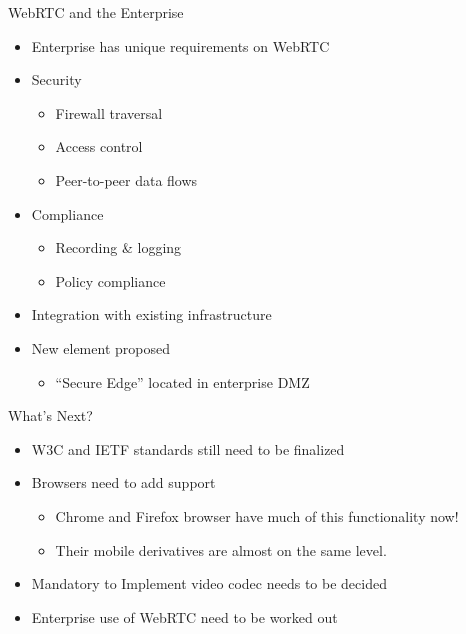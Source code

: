 \begin{frame}{WebRTC and the Enterprise}
\begin{itemize}
\item Enterprise has unique requirements on WebRTC
\item Security
\begin{itemize}
\item Firewall traversal
\item Access control
\item Peer-to-peer data flows
\end{itemize}
\item Compliance
\begin{itemize}
\item Recording \& logging
\item Policy compliance
\end{itemize}
\item Integration with existing infrastructure
\item New element proposed
\begin{itemize}
\item ``Secure Edge'' located in enterprise DMZ
\end{itemize}
\end{itemize}
\end{frame}

\begin{frame}{What's Next?}
\begin{itemize}
\item W3C and IETF standards still need to be finalized
\item Browsers need to add support
\begin{itemize}
\item Chrome and Firefox browser have much of this functionality now!
\item Their mobile derivatives are almost on the same level. 
\end{itemize}
\item Mandatory to Implement video codec needs to be decided
\item Enterprise use of WebRTC need to be worked out
\end{itemize}
\end{frame}